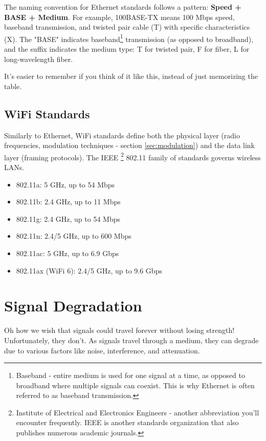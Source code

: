\begin{tipblock}
    The naming convention for Ethernet standards follows a pattern: \textbf{Speed + BASE + Medium}. For example, 100BASE-TX means 100 Mbps speed, baseband transmission, and twisted pair cable (T) with specific characteristics (X). The "BASE" indicates baseband\footnote{
        Baseband - entire medium is used for one signal at a time, as opposed to broadband where multiple signals can coexist. This is why Ethernet is often referred to as baseband transmission.
    } transmission (as opposed to broadband), and the suffix indicates the medium type: T for twisted pair, F for fiber, L for long-wavelength fiber.

    It's easier to remember if you think of it like this, instead of just memorizing the table.
\end{tipblock}


\subsection*{WiFi Standards}
Similarly to Ethernet, WiFi standards define both the physical layer (radio frequencies, modulation techniques - section \ref{sec:modulation}) and the data link layer (framing protocols). The IEEE \footnote{
    Institute of Electrical and Electronics Engineers - another abbreviation you'll encounter frequently. IEEE is another standards organization that also publishes numerous academic journals.
    } 802.11 family of standards governs wireless LANs.
\begin{itemize}
    \item 802.11a: 5 GHz, up to 54 Mbps
    \item 802.11b: 2.4 GHz, up to 11 Mbps
    \item 802.11g: 2.4 GHz, up to 54 Mbps
    \item 802.11n: 2.4/5 GHz, up to 600 Mbps
    \item 802.11ac: 5 GHz, up to 6.9 Gbps
    \item 802.11ax (WiFi 6): 2.4/5 GHz, up to 9.6 Gbps
\end{itemize}

\section{Signal Degradation}
Oh how we wish that signals could travel forever without losing strength! Unfortunately, they don't. As signals travel through a medium, they can degrade due to various factors like noise, interference, and attenuation.

